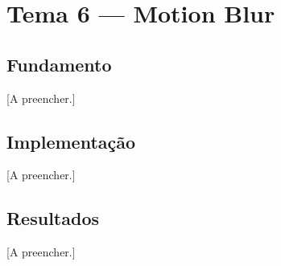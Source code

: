 \documentclass[11pt,a4paper]{article}
\begin{document}
\section{Tema 6 --- Motion Blur}
\label{sec:motionblur}


\subsection{Fundamento}


[A preencher.]

\subsection{Implementação}


[A preencher.]

\subsection{Resultados}



[A preencher.]

\end{document}
